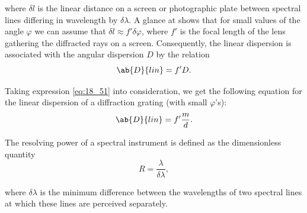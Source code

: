 \noindent
where $\delta{l}$ is the linear distance on a screen or photographic plate between spectral lines differing in wavelength by $\delta{\lambda}$.
A glance at  shows that for small values of the angle $\varphi$ we can assume that $\delta{l}\approx f'\delta{\varphi}$, where $f'$ is the focal length of the lens gathering the diffracted rays on a screen.
Consequently, the linear dispersion is associated with the angular dispersion $D$ by the relation
\begin{equation*}
	\ab{D}{lin} = f' D.
\end{equation*}

\noindent
Taking expression \eqref{eq:18_51} into consideration, we get the following equation for the linear dispersion of a diffraction grating (with small $\varphi$'s):
\begin{equation}\label{eq:18_53}
	\ab{D}{lin} = f' \frac{m}{d}.
\end{equation}

The resolving power of a spectral instrument is defined as the dimensionless quantity
\begin{equation}\label{eq:18_54}
	R = \frac{\lambda}{\delta{\lambda}},
\end{equation}

\noindent
where $\delta{\lambda}$ is the minimum difference between the wavelengths of two spectral lines at which these lines are perceived separately.

